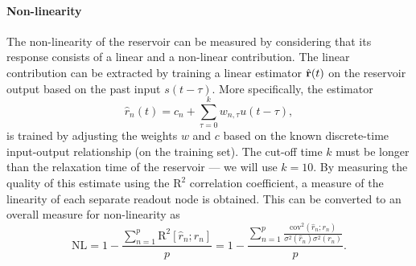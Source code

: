 \paragraph{Non-linearity}
The non-linearity of the reservoir can be measured by considering that its response consists of a linear and a non-linear contribution.
The linear contribution can be extracted by training a linear estimator $\hat{\boldsymbol{\mathbf{r}}}(t)$ on the reservoir output based on the past input $s(t - \tau)$.
More specifically, the estimator
\begin{equation}
	\hat{r}_n(t) = c_n + \sum_{\tau=0}^{k} w_{n,\tau} u(t - \tau) \mathrm{,}
\end{equation}
is trained by adjusting the weights $w$ and $c$ based on the known discrete-time input-output relationship (on the training set).
The cut-off time $k$ must be longer than the relaxation time of the reservoir --- we will use $k=10$.
By measuring the quality of this estimate using the $\mathrm{R}^2$ correlation coefficient, a measure of the linearity of each separate readout node is obtained.
This can be converted to an overall measure for non-linearity as
\begin{equation}
	\mathrm{NL} = 1 - \frac{\sum_{n=1}^p \mathrm{R}^2[\hat{r}_n;r_n]}{p} = 1 - \frac{\sum_{n=1}^p \frac{\mathrm{cov}^2(\hat{r}_n; r_n)}{\sigma^2(\hat{r}_n) \sigma^2(r_n)}}{p} \mathrm{.}
\end{equation}

